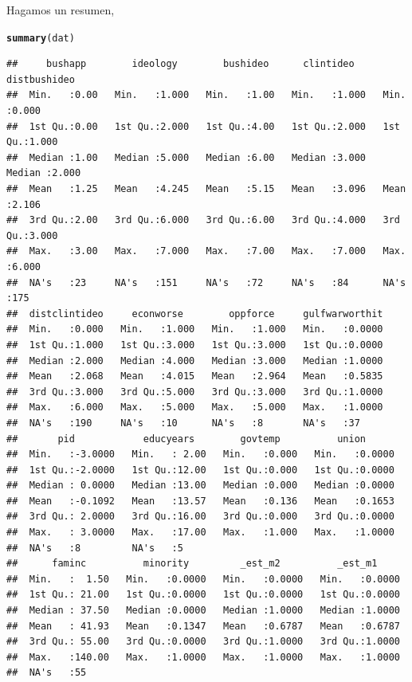 \documentclass[onesided]{article}\usepackage[]{graphicx}\usepackage[]{color}
\makeatletter
\newcommand{\hlstd}[1]{\textcolor[rgb]{0.345,0.345,0.345}{#1}}%
\newcommand{\hlkwd}[1]{\textcolor[rgb]{0.737,0.353,0.396}{\textbf{#1}}}%
\newenvironment{kframe}{%
 \def\at@end@of@kframe{}%
 \ifinner\ifhmode%
  \def\at@end@of@kframe{\end{minipage}}%
  \begin{minipage}{\columnwidth}%
 \fi\fi%
 \def\FrameCommand##1{\hskip\@totalleftmargin \hskip-\fboxsep
 \colorbox{shadecolor}{##1}\hskip-\fboxsep
     \hskip-\linewidth \hskip-\@totalleftmargin \hskip\columnwidth}%
 \MakeFramed {\advance\hsize-\width
   \@totalleftmargin\z@ \linewidth\hsize
   \@setminipage}}%
 {\par\unskip\endMakeFramed%
 \at@end@of@kframe}
\newenvironment{knitrout}{}{} %
\makeatother
\begin{document}
Hagamos un resumen,

\begin{knitrout}
\color{fgcolor}\begin{kframe}
\begin{alltt}
\hlkwd{summary}\hlstd{(dat)}
\end{alltt}
\begin{verbatim}
##     bushapp        ideology        bushideo      clintideo      distbushideo  
##  Min.   :0.00   Min.   :1.000   Min.   :1.00   Min.   :1.000   Min.   :0.000  
##  1st Qu.:0.00   1st Qu.:2.000   1st Qu.:4.00   1st Qu.:2.000   1st Qu.:1.000  
##  Median :1.00   Median :5.000   Median :6.00   Median :3.000   Median :2.000  
##  Mean   :1.25   Mean   :4.245   Mean   :5.15   Mean   :3.096   Mean   :2.106  
##  3rd Qu.:2.00   3rd Qu.:6.000   3rd Qu.:6.00   3rd Qu.:4.000   3rd Qu.:3.000  
##  Max.   :3.00   Max.   :7.000   Max.   :7.00   Max.   :7.000   Max.   :6.000  
##  NA's   :23     NA's   :151     NA's   :72     NA's   :84      NA's   :175    
##  distclintideo     econworse        oppforce     gulfwarworthit  
##  Min.   :0.000   Min.   :1.000   Min.   :1.000   Min.   :0.0000  
##  1st Qu.:1.000   1st Qu.:3.000   1st Qu.:3.000   1st Qu.:0.0000  
##  Median :2.000   Median :4.000   Median :3.000   Median :1.0000  
##  Mean   :2.068   Mean   :4.015   Mean   :2.964   Mean   :0.5835  
##  3rd Qu.:3.000   3rd Qu.:5.000   3rd Qu.:3.000   3rd Qu.:1.0000  
##  Max.   :6.000   Max.   :5.000   Max.   :5.000   Max.   :1.0000  
##  NA's   :190     NA's   :10      NA's   :8       NA's   :37      
##       pid            educyears        govtemp          union       
##  Min.   :-3.0000   Min.   : 2.00   Min.   :0.000   Min.   :0.0000  
##  1st Qu.:-2.0000   1st Qu.:12.00   1st Qu.:0.000   1st Qu.:0.0000  
##  Median : 0.0000   Median :13.00   Median :0.000   Median :0.0000  
##  Mean   :-0.1092   Mean   :13.57   Mean   :0.136   Mean   :0.1653  
##  3rd Qu.: 2.0000   3rd Qu.:16.00   3rd Qu.:0.000   3rd Qu.:0.0000  
##  Max.   : 3.0000   Max.   :17.00   Max.   :1.000   Max.   :1.0000  
##  NA's   :8         NA's   :5                                       
##      faminc          minority         _est_m2          _est_m1      
##  Min.   :  1.50   Min.   :0.0000   Min.   :0.0000   Min.   :0.0000  
##  1st Qu.: 21.00   1st Qu.:0.0000   1st Qu.:0.0000   1st Qu.:0.0000  
##  Median : 37.50   Median :0.0000   Median :1.0000   Median :1.0000  
##  Mean   : 41.93   Mean   :0.1347   Mean   :0.6787   Mean   :0.6787  
##  3rd Qu.: 55.00   3rd Qu.:0.0000   3rd Qu.:1.0000   3rd Qu.:1.0000  
##  Max.   :140.00   Max.   :1.0000   Max.   :1.0000   Max.   :1.0000  
##  NA's   :55
\end{verbatim}
\end{kframe}
\end{knitrout}
\end{document}
